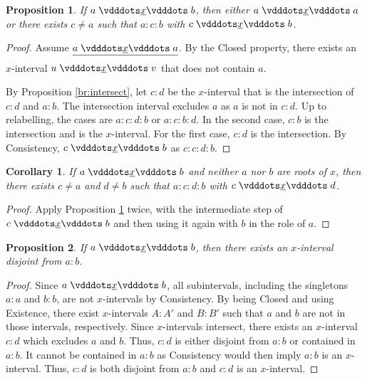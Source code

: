 \documentclass[12pt]{article}
\newtheorem{corollary}{Corollary}[section]
\newtheorem{proposition}{Proposition}[section]
\begin{document}
\begin{proposition}\label{br:something-inside}
    If $a \xrel b$, then either $a \xrel a$ or there exists $c \neq a$ such that $a : c : b$ with $c \xrel b$. 
\end{proposition}

\begin{proof}
    Assume $\sout{a \xrel a}$. By the Closed property, there exists an $x$-interval $u \xrel v$ that does not contain $a$.

    By Proposition \ref{br:intersect}, let $c:d$ be the $x$-interval that is the intersection of $c:d$ and $a:b$. The intersection interval excludes $a$ as $a$ is not in $c:d$. Up to relabelling, the cases are $a:c:d:b$ or $a:c:b:d$. In the second case, $c:b$ is the intersection and is the $x$-interval. For the first case, $c:d$ is the intersection. By Consistency, $c \xrel b$ as $c:c:d:b$. 
\end{proof}

\begin{corollary}\label{br:doublesomething-inside}
    If $a \xrel b$ and neither $a$ nor $b$ are roots of $x$, then there exists $c \neq a$ and $d \neq b$ such that $a : c : d : b$ with $c \xrel d$. 
\end{corollary}

\begin{proof}
Apply Proposition \ref{br:something-inside} twice, with the intermediate step of $c \xrel b$ and then using it again with $b$ in the role of $a$. 
\end{proof}


\begin{proposition}\label{br:something-outside}
    If \sout{$a \xrel b$}, then there exists an $x$-interval disjoint from $a:b$.
\end{proposition}

\begin{proof}
    Since \sout{$a \xrel b$}, all subintervals, including the singletons $a:a$ and $b:b$, are not $x$-intervals by Consistency. By being Closed and using Existence, there exist $x$-intervals $A:A'$ and $B:B'$ such that $a$ and $b$ are not in those intervals, respectively. Since $x$-intervals intersect, there exists an $x$-interval $c:d$ which excludes $a$ and $b$. Thus, $c:d$ is either disjoint from $a:b$ or contained in $a:b$. It cannot be contained in $a:b$ as Consistency would then imply $a:b$ is an $x$-interval. Thus, $c:d$ is both disjoint from $a:b$ and $c:d$ is an $x$-interval.
\end{proof}
\end{document}
